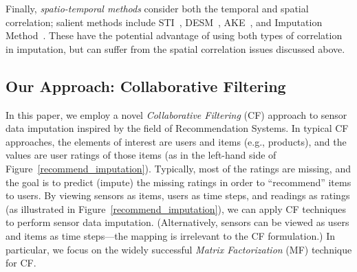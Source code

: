 Finally, {\em spatio-temporal methods} consider both the
temporal and spatial correlation; salient methods include
STI~\cite{Jian-Zhong:STI}, DESM~\cite{li2008data}, 
AKE~\cite{pan2010k}, and Imputation Method~\cite{Lim:robust}.  These
have the potential advantage of using both types of correlation in
imputation, but can suffer from the spatial correlation issues
discussed above.




\subsection{Our Approach: Collaborative Filtering}

In this paper, we employ a novel {\em Collaborative Filtering} (CF) approach
to sensor data imputation inspired by the field of Recommendation
Systems.  In typical CF approaches, the elements of interest are users
and items (e.g., products), and the values are user ratings of those
items (as in the left-hand side of
Figure~\ref{recommend_imputation}).  Typically, most of the ratings
are missing, and the goal is to predict (impute) the missing ratings
in order to ``recommend'' items to users.  By viewing sensors as
items, users as time steps, and readings as ratings (as illustrated in
Figure~\ref{recommend_imputation}), we can apply CF
techniques to perform sensor data imputation. (Alternatively, sensors
can be viewed as users and items as time steps---the mapping is
irrelevant to the CF formulation.)  In particular, we focus on the
widely successful {\em Matrix Factorization} (MF) technique for CF.

